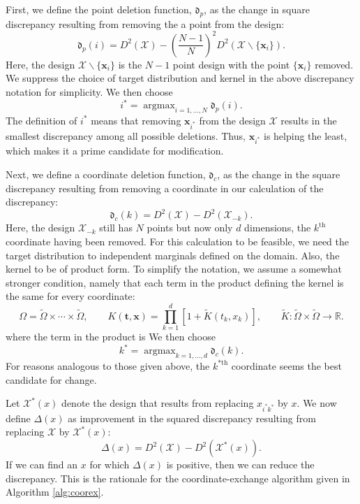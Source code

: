 \documentclass[graybox]{svmult}
\newcommand{\reals}{\mathbb{R}}
\newcommand{\vx}{\boldsymbol{x}}
\newcommand{\vt}{\boldsymbol{t}}
\DeclareMathOperator*{\argmax}{argmax}
\newcommand{\Xdes}{\mathcal{X}}
\newcommand{\frakd}{\mathfrak{d}}
\newcommand{\tK}{\widetilde{K}}
\newcommand{\tOmega}{\widetilde{\Omega}}
\begin{document}
First, we define the point deletion function, $\frakd_p$, as the change in square discrepancy resulting from removing the a point from the design:
\begin{equation}\label{eq:rowdeletion}
\frakd_p(i) = D^2(\Xdes)-\left(\frac{N-1}{N}\right)^2 D^2(\Xdes\backslash \{\vx_i\}).
\end{equation}
Here, the design $\Xdes\backslash \{\vx_i\}$ is the $N-1$ point design with the point $\{\vx_i\}$ removed. We suppress the choice of target distribution and kernel in the above discrepancy notation for simplicity. We then choose 
\begin{equation} \label{eq:rowchoice}
    i^*=\argmax_{i=1,\ldots,N} \frakd_p(i).
\end{equation}
The definition of $i^*$ means that removing $\vx_{i^*}$ from the design $\Xdes$ results in the smallest discrepancy among all possible deletions.  Thus, $\vx_{i^*}$ is helping the least, which makes it a prime candidate for modification.

Next, we define a coordinate deletion function, $\frakd_{c}$, as the change in the square discrepancy resulting from removing a coordinate in our calculation of the discrepancy:
\begin{equation}\label{eq:coorddeletion}
\frakd_c(k) = D^2(\Xdes)-D^2(\Xdes_{-k}).
\end{equation}
Here, the design $\Xdes_{-k}$ still has $N$ points but now only $d$ dimensions, the $k^{\text{th}}$ coordinate having been removed.  For this calculation to be feasible, we need the target distribution to independent marginals defined on the domain.  Also, the kernel to be of product form.  To simplify the notation, we assume a somewhat stronger condition, namely that each term in the product defining the kernel is the same for every coordinate:
\begin{equation}
    \label{eq:prodkernel}
    \Omega = \tOmega \times \cdots \times \tOmega, \qquad K(\vt,\vx) = \prod_{k=1}^d [1+ \tK(t_k,x_k)], \qquad \tK:\tOmega \times \tOmega \to \reals.
\end{equation}
where the term in the product is 
We then choose 
\begin{equation} \label{eq:rowchoice}
    k^*=\argmax_{k=1, \ldots, d} \frakd_c(k).
\end{equation}
For reasons analogous to those given above, the $k^{*\text{th}}$ coordinate seems the best candidate for change.

Let $\Xdes^*(x)$ denote the design that results from replacing $x_{i^*k^*}$ by $x$.  We now define $\Delta(x)$ as improvement in the squared discrepancy resulting from replacing $\Xdes$ by $\Xdes^*(x)$:
\begin{equation}\label{eq:deltafun}
\Delta(x) = D^2(\Xdes)-D^2(\Xdes^*(x)).
\end{equation}
If we can find an $x$ for which $\Delta(x)$ is positive, then we can reduce the discrepancy.  This is the rationale for the coordinate-exchange algorithm given in  Algorithm \ref{alg:coorex}. 
\end{document}
